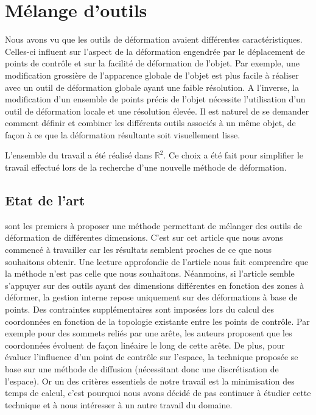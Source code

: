 

\chapter{Mélange d'outils}

\graphicspath{ {Chapter3/Chapter3Figs/PNG/}
  {Chapter3/Chapter3Figs/PDF/} {Chapter3/Chapter3Figs/} }

Nous avons vu que les outils de déformation avaient différentes
caractéristiques. Celles-ci influent sur l'aspect de la déformation engendrée
par le déplacement de points de contrôle et sur la facilité de déformation de
l'objet. Par exemple, une modification grossière de l'apparence globale de
l'objet est plus facile à réaliser avec un outil de déformation globale ayant
une faible résolution. A l'inverse, la modification d'un ensemble de points
précis de l'objet nécessite l'utilisation d'un outil de déformation locale et
une résolution élevée. Il est naturel de se demander comment définir et
combiner les différents outils associés à un même objet, de façon à ce que la
déformation résultante soit visuellement lisse.

L'ensemble du travail a été réalisé dans $\mathbb{R}^2$. Ce choix a été fait
pour simplifier le travail effectué lors de la recherche d'une nouvelle
méthode de déformation.

\section{Etat de l'art}

\cite{JBPS11} sont les premiers à proposer une méthode permettant de mélanger
des outils de déformation de différentes dimensions. C'est sur cet article que
nous avons commencé à travailler car les résultats semblent proches de ce que
nous souhaitons obtenir. Une lecture approfondie de l'article nous fait
comprendre que la méthode n'est pas celle que nous souhaitons. Néanmoins, si
l'article semble s'appuyer sur des outils ayant des dimensions différentes en
fonction des zones à déformer, la gestion interne repose uniquement sur des
déformations à base de points. Des contraintes supplémentaires sont imposées
lors du calcul des coordonnées en fonction de la topologie existante entre les
points de contrôle. Par exemple pour des sommets reliés par une arête, les
auteurs proposent que les coordonnées évoluent de façon linéaire le long de
cette arête. De plus, pour évaluer l'influence d'un point de contrôle sur
l'espace, la technique proposée se base sur une méthode de diffusion
(nécessitant donc une discrétisation de l'espace). Or un des critères
essentiels de notre travail est la minimisation des temps de calcul, c'est
pourquoi nous avons décidé de pas continuer à étudier cette technique et à
nous intéresser à un autre travail du domaine.

